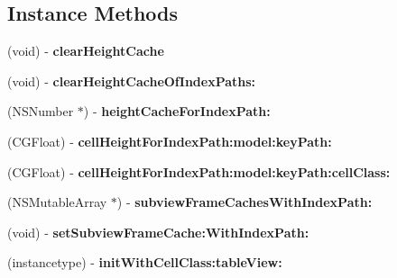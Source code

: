\subsection*{Instance Methods}
\begin{DoxyCompactItemize}
\item 
\mbox{\label{interface_s_d_cell_auto_height_manager_ad6f9456c8b545b930a15bc7082ad20e4}} 
(void) -\/ {\bfseries clear\+Height\+Cache}
\item 
\mbox{\label{interface_s_d_cell_auto_height_manager_adf4ca610ef22e747bb2df1a9f235aa14}} 
(void) -\/ {\bfseries clear\+Height\+Cache\+Of\+Index\+Paths\+:}
\item 
\mbox{\label{interface_s_d_cell_auto_height_manager_a4070468f90f41067d6738a1be234dfe7}} 
(N\+S\+Number $\ast$) -\/ {\bfseries height\+Cache\+For\+Index\+Path\+:}
\item 
\mbox{\label{interface_s_d_cell_auto_height_manager_a2a5896ec493fc5df80c9e1ff592c21c7}} 
(C\+G\+Float) -\/ {\bfseries cell\+Height\+For\+Index\+Path\+:model\+:key\+Path\+:}
\item 
\mbox{\label{interface_s_d_cell_auto_height_manager_af9c607476f787a5481ca8b36114347fd}} 
(C\+G\+Float) -\/ {\bfseries cell\+Height\+For\+Index\+Path\+:model\+:key\+Path\+:cell\+Class\+:}
\item 
\mbox{\label{interface_s_d_cell_auto_height_manager_a4f8cba36a583c453a5df1f7807403ea4}} 
(N\+S\+Mutable\+Array $\ast$) -\/ {\bfseries subview\+Frame\+Caches\+With\+Index\+Path\+:}
\item 
\mbox{\label{interface_s_d_cell_auto_height_manager_ab7d9fba723cd6ad3d9546d06406aacbc}} 
(void) -\/ {\bfseries set\+Subview\+Frame\+Cache\+:\+With\+Index\+Path\+:}
\item 
\mbox{\label{interface_s_d_cell_auto_height_manager_ac52143331c0c4acae103205e07a52b29}} 
(instancetype) -\/ {\bfseries init\+With\+Cell\+Class\+:table\+View\+:}

\end{DoxyCompactItemize}
